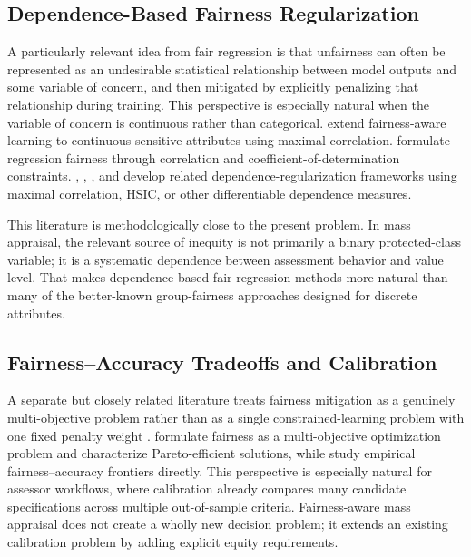 \documentclass[12pt]{article}
\theoremstyle{plain}
\theoremstyle{definition}
\begin{document}
\subsection{Dependence-Based Fairness Regularization}

A particularly relevant idea from fair regression is that unfairness can often be represented as an undesirable statistical relationship between model outputs and some variable of concern, and then mitigated by explicitly penalizing that relationship during training. This perspective is especially natural when the variable of concern is continuous rather than categorical. \textcite{MaryEtAl2019} extend fairness-aware learning to continuous sensitive attributes using maximal correlation. \textcite{KomiyamaEtAl2018} formulate regression fairness through correlation and coefficient-of-determination constraints. \textcite{lee2022maximal}, \textcite{PerezSuayEtAl2017}, \textcite{LiEtAl2022Fairness}, and \textcite{BuylDefranceDeBie2024FAIRRET} develop related dependence-regularization frameworks using maximal correlation, HSIC, or other differentiable dependence measures.

This literature is methodologically close to the present problem. In mass appraisal, the relevant source of inequity is not primarily a binary protected-class variable; it is a systematic dependence between assessment behavior and value level. That makes dependence-based fair-regression methods more natural than many of the better-known group-fairness approaches designed for discrete attributes.

\subsection{Fairness--Accuracy Tradeoffs and Calibration}

A separate but closely related literature treats fairness mitigation as a genuinely multi-objective problem rather than as a single constrained-learning problem with one fixed penalty weight \cite{CatonHaas2024}. \textcite{martinez2020minimax} formulate fairness as a multi-objective optimization problem and characterize Pareto-efficient solutions, while \textcite{little2022fairness} study empirical fairness--accuracy frontiers directly. This perspective is especially natural for assessor workflows, where calibration already compares many candidate specifications across multiple out-of-sample criteria. Fairness-aware mass appraisal does not create a wholly new decision problem; it extends an existing calibration problem by adding explicit equity requirements.
\end{document}
